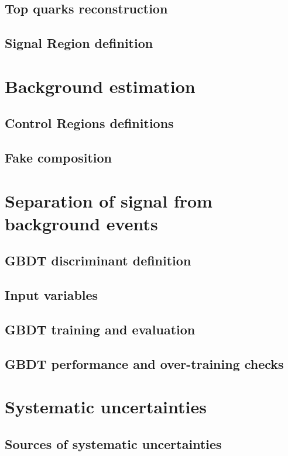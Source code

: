 \subsection {Top quarks reconstruction}
\clearpage
\subsection {Signal Region definition}


\clearpage
\section{Background estimation}
\clearpage
\subsection {Control Regions definitions}
\clearpage
\subsection {Fake composition}



\clearpage
\section{Separation of signal from background events}
\clearpage
\subsection {GBDT discriminant definition}
\clearpage
\subsection {Input variables}
\clearpage
\subsection {GBDT training and evaluation}
\clearpage
\subsection {GBDT performance and over-training checks }


\clearpage
\section{Systematic uncertainties}
\clearpage
\subsection {Sources of systematic uncertainties}
\clearpage

